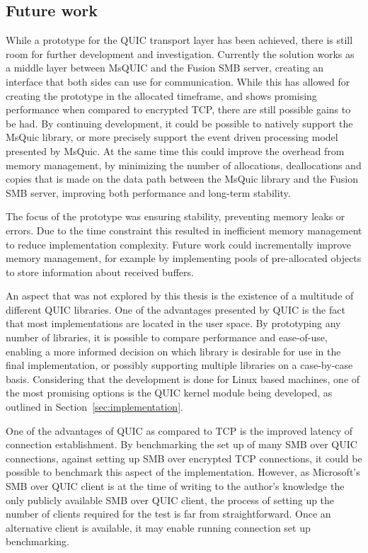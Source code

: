 \documentclass[english, 12pt, a4paper, elec, utf8, a-2b, online]{aaltothesis}
\begin{document}
\subsection{Future work}

While a prototype for the QUIC transport layer has been achieved, there is still
room for further development and investigation. Currently the solution works as
a middle layer between MsQUIC and the Fusion SMB server, creating an interface
that both sides can use for communication. While this has allowed for creating
the prototype in the allocated timeframe, and shows promising performance when compared
to encrypted TCP, there are still possible gains to be had. By continuing development,
it could be possible to natively support the MsQuic library, or more precisely support
the event driven processing model presented by MsQuic. At the same time
this could improve the overhead from memory management, by minimizing the number of allocations,
deallocations and copies that is made on the data path between the MsQuic library
and the Fusion SMB server, improving both performance and long-term stability.

The focus of the prototype was ensuring stability, preventing memory leaks or errors.
Due to the time constraint this resulted in inefficient memory management to reduce
implementation complexity. Future work could incrementally improve memory management,
for example by implementing pools of pre-allocated objects to store information
about received buffers.

An aspect that was not explored by this thesis is the existence of a multitude of
different QUIC libraries.
One of the advantages presented by QUIC is the fact that most implementations are located
in the user space. By prototyping any number of libraries, it is possible to
compare performance and ease-of-use, enabling a more informed decision on which
library is desirable for use in the final implementation, or possibly supporting multiple
libraries on a case-by-case basis. Considering that the development
is done for Linux based machines, one of the most promising options is the QUIC
kernel module being developed, as outlined in Section~\ref{sec:implementation}.

One of the advantages of QUIC as compared to TCP is the improved latency of connection
establishment. By benchmarking the set up of many SMB over QUIC connections, against
setting up SMB over encrypted TCP connections, it could be possible to benchmark this
aspect of the implementation. However, as Microsoft's SMB over QUIC client
is at the time of writing to the author's knowledge the only publicly available SMB
over QUIC client, the process of setting up the number of clients required for the
test is far from straightforward. Once an alternative client is available, it may
enable running connection set up benchmarking.
\end{document}
